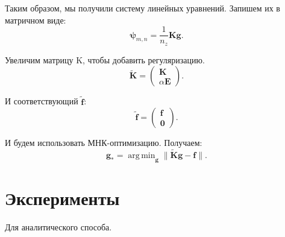 \documentclass[12pt, a4paper]{report}
\DeclareMathOperator*{\argmin}{arg\,min}
\begin{document}
Таким образом, мы получили систему линейных уравнений. Запишем их в матричном виде:
\[
    \bm{\psi}_{m,n} = \frac{1}{n_z} \bm{K} \bm{g}
.\]

Увеличим матрицу K, чтобы добавить регуляризацию.
\[
    \bm{\tilde K} = 
    \begin{pmatrix}
        \bm{K} \\
        \alpha \bm{E}
    \end{pmatrix}
.\]

И соответствующий $\bm{\tilde f}$:
\[
    \bm{\tilde f} = 
    \begin{pmatrix}
        \bm{f} \\
        \bm{0}
    \end{pmatrix}
.\]

И будем использовать МНК-оптимизацию. Получаем:
\[
    \bm{g_*} = \argmin_{\bm{g}} \| \bm{\tilde K} \bm{g} - \bm{f} \|
.\]
%
%
\chapter{Эксперименты}
%
Для аналитического способа.
\end{document}
